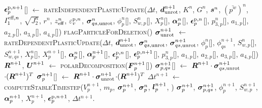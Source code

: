 \begin{breakablealgorithm}
\begin{algorithmic}[1]
           $\boldsymbol{\epsilon}_{p}^{\text{p},n+1}$[\TTpart] $\leftarrow$ \WRP 
           \textsc{rateIndependentPlasticUpdate}($\Delta t$, $\boldsymbol{d}_{\text{unrot}}^{n+1}$, 
                 $K^n$, $G^n$, $\boldsymbol{s}^n$, $(\bar{p^w})^n$, $I_1^{\text{eff},n}$, 
                 $\sqrt{J_2^n}$, $r^n$, $z_{\text{eff}}^n$, \WRP $\varepsilon_v^{\text{p},n}$,
                 $\boldsymbol{\sigma}_{qs,\text{unrot}}^n$, $\phi_p^n$[\TTpart], $S_{w,p}^n$[\TTpart], $X_p^n$[\TTpart], 
                 $\boldsymbol{\alpha}_p^n$[\TTpart], $\boldsymbol{\epsilon}_p^{\text{p},n}$[\TTpart], 
                 $p^n_{3,p}$[\TTpart], \WRP $a_{1,p}$[\TTpart], $a_{2,p}$[\TTpart], 
                 $a_{3,p}$[\TTpart], $a_{4,p}$[\TTpart]) \WRP
          \State \textsc{flagParticleForDeletion}(\TTpart)
        \EndIf
        \State $\boldsymbol{\sigma}_{\text{unrot}}^{n+1}$ $\leftarrow$ 
           \textsc{rateDependentPlasticUpdate}($\Delta t$, $\boldsymbol{d}_{\text{unrot}}^{n+1}$, 
                 $\boldsymbol{\sigma}_{qs,\text{unrot}}^n$, $\boldsymbol{\sigma}_{qs,\text{unrot}}^{n+1}$, 
                 $\phi_p^n$[\TTpart], $\phi_{qs}^{n+1}$, \WRP 
                 $S_{w,p}^n$[\TTpart], $S_{w,qs}^{n+1}$, 
                 $X_p^n$[\TTpart], $X_p^{n+1}$[\TTpart], 
                 $\boldsymbol{\alpha}_p^n$[\TTpart], $\boldsymbol{\alpha}_{p}^{n+1}$[\TTpart], \WRP
                 $\boldsymbol{\epsilon}_p^{\text{p},n}$[\TTpart], $\boldsymbol{\epsilon}_{p}^{\text{p},n+1}$[\TTpart], 
                 $p^n_{3,p}$[\TTpart], \WRP $a_{1,p}$[\TTpart], $a_{2,p}$[\TTpart], 
                 $a_{3,p}$[\TTpart], $a_{4,p}$[\TTpart])
        \State $\boldsymbol{R}^{n+1}$, $\boldsymbol{U}^{n+1}$ $\leftarrow$ \textsc{polarDecomposition}($\boldsymbol{F}_p^{n+1}$[\TTpart])
        \State $\boldsymbol{\sigma}^{n+1}_{p,qs}$[\TTpart] $\leftarrow$ $\boldsymbol{R}^{n+1} \cdot \boldsymbol{\sigma}^{n+1}_{qs,\text{unrot}}$$ \cdot (\boldsymbol{R}^{n+1})^T$
        \State $\boldsymbol{\sigma}_p^{n+1}$[\TTpart] $\leftarrow$  $\boldsymbol{R}^{n+1} \cdot \boldsymbol{\sigma}^{n+1}_{\text{unrot}}$$ \cdot (\boldsymbol{R}^{n+1})^T$
      \EndFor
      \State $\Delta t^{n+1}$ $\leftarrow$ \textsc{computeStableTimestep}($V_p^{n+1}$, $m_p$, $\boldsymbol{\sigma}_p^{n+1}$,
                  $\boldsymbol{\sigma}_p^n$, $\boldsymbol{l}_p^{n+1}$, )
      \State \Return $\boldsymbol{\sigma}_p^{n+1}$, $\boldsymbol{\sigma}_{p,qs}^{n+1}$, $\phi_p^{n+1}$, $S_{w,p}^{n+1}$, $\boldsymbol{\alpha}_p^{n+1}$,
                $X_p^{n+1}$, $\boldsymbol{\epsilon}_p^{\text{p}, n+1}$, $\Delta t^{n+1}$.
    \EndProcedure
  \end{algorithmic}
\end{breakablealgorithm}

